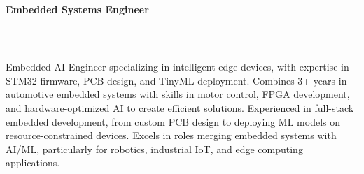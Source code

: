 \begin{center}
    {\Large \textbf{Embedded Systems Engineer}} \\
    \rule{\textwidth}{0.4pt} \\%
    \begin{minipage}{\textwidth} %
        \vspace{10pt}
        Embedded AI Engineer specializing in intelligent edge devices, with expertise in STM32 firmware, PCB design, and TinyML deployment. Combines 3+ years in automotive embedded systems with skills in motor control, FPGA development, and hardware-optimized AI to create efficient solutions. Experienced in full-stack embedded development, from custom PCB design to deploying ML models on resource-constrained devices. Excels in roles merging embedded systems with AI/ML, particularly for robotics, industrial IoT, and edge computing applications.
    \end{minipage}
    \vspace{15pt}
\end{center}